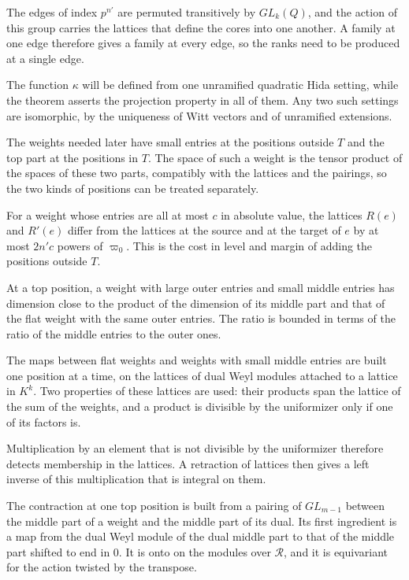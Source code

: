 The edges of index $p^{n'}$ are permuted transitively by $GL_k(Q)$, and the action of this group
carries the lattices that define the cores into one another. A family at one edge therefore gives a
family at every edge, so the ranks need to be produced at a single edge.

The function $\kappa$ will be defined from one unramified quadratic Hida setting, while the theorem
asserts the projection property in all of them. Any two such settings are isomorphic, by the
uniqueness of Witt vectors and of unramified extensions.

The weights needed later have small entries at the positions outside $T$ and the top part at the
positions in $T$. The space of such a weight is the tensor product of the spaces of these two parts,
compatibly with the lattices and the pairings, so the two kinds of positions can be treated
separately.

For a weight whose entries are all at most $c$ in absolute value, the lattices $R(e)$ and $R'(e)$
differ from the lattices at the source and at the target of $e$ by at most $2n'c$ powers of
$\varpi_0$. This is the cost in level and margin of adding the positions outside $T$.

At a top position, a weight with large outer entries and small middle entries has dimension close
to the product of the dimension of its middle part and that of the flat weight with the same outer
entries. The ratio is bounded in terms of the ratio of the middle entries to the outer ones.

The maps between flat weights and weights with small middle entries are built one position at a
time, on the lattices of dual Weyl modules attached to a lattice in $K^k$. Two properties of these
lattices are used: their products span the lattice of the sum of the weights, and a product is
divisible by the uniformizer only if one of its factors is.

Multiplication by an element that is not divisible by the uniformizer therefore detects membership in
the lattices. A retraction of lattices then gives a left inverse of this multiplication that is
integral on them.

The contraction at one top position is built from a pairing of $GL_{m-1}$ between the middle part of a
weight and the middle part of its dual. Its first ingredient is a map from the dual Weyl module of the
dual middle part to that of the middle part shifted to end in $0$. It is onto on the modules over
$\mathcal R$, and it is equivariant for the action twisted by the transpose.

